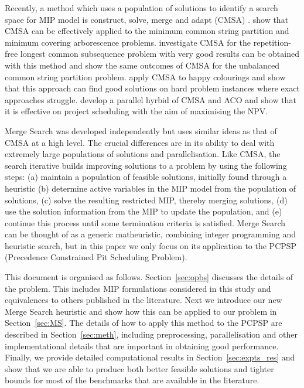 \documentclass[authoryear,11pt,square,number,times,super,comma]{elsarticle}
\begin{document}
Recently, a method which uses a population of solutions to identify a search space for MIP model is construct, solve, merge and adapt (CMSA) \citep{Blum2016,BlumBlesa16,Blum16-2,Lewis2019,Thiruvady2019}. \citet{Blum2016} show that CMSA can be effectively applied to the minimum common string partition and minimum covering arborescence problems. \citet{BlumBlesa16} investigate CMSA for the repetition-free longest common subsequence problem with very good results can be obtained with this method and \cite{Blum16-2} show the same outcomes of CMSA for the unbalanced common string partition problem. \citet{Lewis2019} apply CMSA to happy colourings and show that this approach can find good solutions on hard problem instances where exact approaches struggle. \citet{Thiruvady2019} develop a parallel hyrbid of CMSA and ACO and show that it is effective on project scheduling with the aim of maximising the NPV.  

Merge Search was developed independently but uses similar ideas as that of CMSA at a high level. The crucial differences are in its ability to deal with extremely large populations of solutions and parallelisation. Like CMSA, the search iterative builds improving solutions to a problem by using the following steps: (a) maintain a population of feasible solutions, initially found through a heuristic (b) determine active variables in the MIP model from the population of solutions, (c) solve the resulting restricted MIP, thereby merging solutions, (d) use the solution information from the MIP to update the population, and (e) continue this process until some termination criteria is satisfied. Merge Search can be thought of as a generic matheuristic, combining integer programming and heuristic search,  but in this paper we only focus on its application to the PCPSP (Precedence Constrained Pit Scheduling Problem).

This document is organised as follows.  Section~\ref{sec:opbs} discusses the
details of the problem. This includes MIP formulations considered in this study and
equivalences to others published in the literature.  Next we introduce our new Merge Search heuristic and show how this can be applied to our problem in Section~\ref{sec:MS}. The details of how to apply this method to the PCPSP are described in Section~\ref{sec:meth}, including preprocessing, parallelisation and other implementational details that are important in obtaining good performance. Finally, we 
provide detailed computational results in Section~\ref{sec:expts_res} and show that we are able to produce both better feasible solutions and tighter bounds for most of the benchmarks that are available in the literature.
\end{document}

